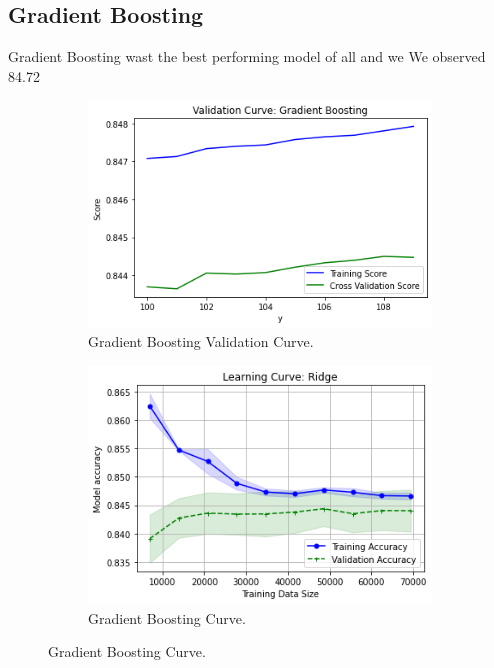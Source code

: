 \subsection{Gradient Boosting}
Gradient Boosting wast the best performing model of all and we We observed 84.72%
\begin{figure}[h]
\centering
\begin{subfigure}[b]{0.45\linewidth}
    \includegraphics[width=\linewidth]{gbcvc}
    \caption{Gradient Boosting Validation Curve.}
\end{subfigure}
\begin{subfigure}[b]{0.45\linewidth}
    \includegraphics[width=\linewidth]{gbclc}
    \caption{Gradient Boosting Curve.}
\end{subfigure}
\end{figure}

